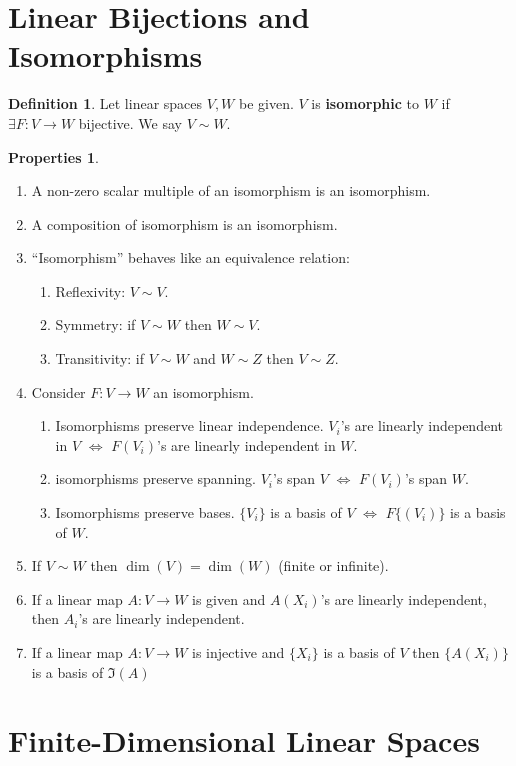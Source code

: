 \documentclass{book}
\theoremstyle{definition}
\newtheorem{defn}{Definition}[section]
\newtheorem{prop}{Properties}[section]
\begin{document}
\section{Linear Bijections and Isomorphisms}
\begin{defn}
	Let linear spaces $V, W$ be given. $V$ is \textbf{isomorphic} to $W$ if $\exists F : V \rightarrow W$ bijective. We say $V \sim W$. 
\end{defn}
\begin{prop}
	$\,$
	\begin{enumerate}
		\item A non-zero scalar multiple of an isomorphism is an isomorphism.
		\item A composition of isomorphism is an isomorphism.
		\item ``Isomorphism'' behaves like an equivalence relation:
		\begin{enumerate}
			\item Reflexivity: $V \sim V$.
			\item Symmetry: if $V\sim W$ then $W\sim V$.
			\item Transitivity: if $V\sim W$ and $W \sim Z$ then $V\sim Z$.
		\end{enumerate}
		\item Consider $F : V \rightarrow W$ an isomorphism.
			\begin{enumerate}
				\item Isomorphisms preserve linear independence. $V_i$'s are linearly independent in $V$ $\iff$ $F(V_i)$'s are linearly independent in $W$.
				\item isomorphisms preserve spanning. $V_i$'s span $V$ $\iff$ $F(V_i)$'s span $W$.
				\item Isomorphisms preserve bases. $\{V_i\}$ is a basis of $V$ $\iff$ $F\{(V_i)\}$ is a basis of $W$.
			\end{enumerate}
		\item If $V\sim W$ then $\dim(V) = \dim(W)$ (finite or infinite).
		\item If a linear map $A : V \rightarrow W$ is given and $A(X_i)$'s are linearly independent, then $A_i$'s are linearly independent.  
		\item If a linear map $A : V \rightarrow W$ is injective and $\{ X_i\}$ is a basis of $V$ then $\{ A(X_i)\}$ is a basis of $\Im(A)$
	\end{enumerate}
\end{prop}
\section{Finite-Dimensional Linear Spaces}
\end{document}
